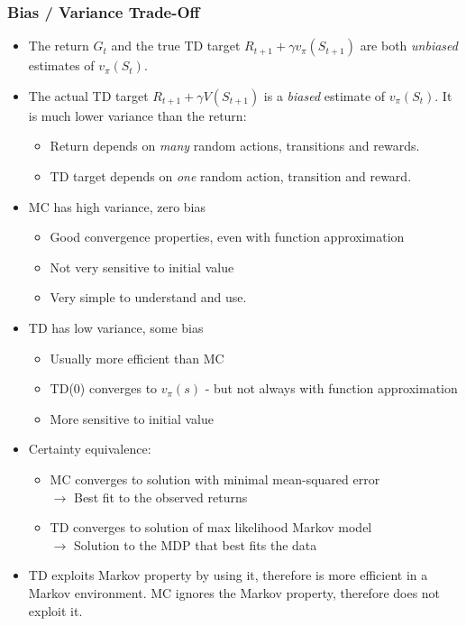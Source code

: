 \documentclass[10pt]{article}
\begin{document}
\subsubsection*{Bias / Variance Trade-Off}
\begin{itemize}
\item The return $G_{t}$ and the true TD target $R_{t+1}+\gamma v_{\pi}(S_{t+1})$ are both \textit{unbiased} estimates of $v_{\pi}(S_{t})$. 
\item The actual TD target $R_{t+1}+\gamma V(S_{t+1})$ is a \textit{biased} estimate of $v_{\pi}(S_{t})$. It is much lower variance than the return:
\begin{itemize}
\item Return depends on \textit{many} random actions, transitions and rewards.
\item TD target depends on \textit{one} random action, transition and reward.
\end{itemize}
\item MC has high variance, zero bias
\begin{itemize}
\item Good convergence properties, even with function approximation
\item Not very sensitive to initial value
\item Very simple to understand and use.
\end{itemize}
\item TD has low variance, some bias
\begin{itemize}
\item Usually more efficient than MC
\item TD(0) converges to $v_{\pi}(s)$ - but not always with function approximation
\item More sensitive to initial value
\end{itemize}
\item Certainty equivalence:
\begin{itemize}
\item MC converges to solution with minimal mean-squared error \\ $ \rightarrow$ Best fit to the observed returns
\item TD converges to solution of max likelihood Markov model \\ $ \rightarrow$ Solution to the MDP that best fits the data
\end{itemize}
\item TD exploits Markov property by using it, therefore is more efficient in a Markov environment. MC ignores the Markov property, therefore does not exploit it.
\end{itemize}
\end{document}
